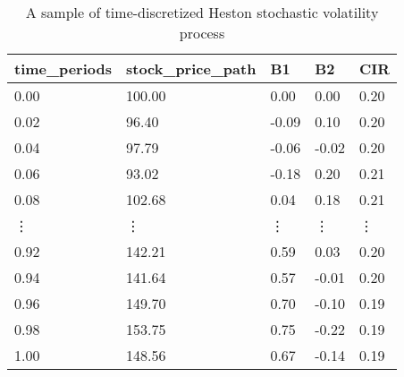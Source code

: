 \documentclass[12pt]{report}
\begin{document}
\begin{appendices}
\begin{table}[H]
\centering
\begin{tabular}{lllll}
  \hline
 time\_periods & stock\_price\_path & B1 & B2 & CIR \\ 
  \hline
  0.00 & 100.00 & 0.00 & 0.00 & 0.20 \\ 
  0.02 & 96.40 & -0.09 & 0.10 & 0.20 \\ 
  0.04 & 97.79 & -0.06 & -0.02 & 0.20 \\ 
  0.06 & 93.02 & -0.18 & 0.20 & 0.21 \\ 
  0.08 & 102.68 & 0.04 & 0.18 & 0.21 \\ 
  \vdots &\vdots &\vdots &\vdots &\vdots\\
  0.92 & 142.21 & 0.59 & 0.03 & 0.20 \\ 
  0.94 & 141.64 & 0.57 & -0.01 & 0.20 \\ 
  0.96 & 149.70 & 0.70 & -0.10 & 0.19 \\ 
  0.98 & 153.75 & 0.75 & -0.22 & 0.19 \\ 
  1.00 & 148.56 & 0.67 & -0.14 & 0.19 \\ 
   \hline
\end{tabular}
\caption{A sample of time-discretized Heston stochastic volatility process}
\end{table}

\end{appendices}











\end{document}
